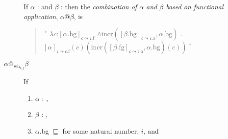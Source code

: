 \begin{description}
  If $\alpha$ :  
and $\beta$ : 
                         then the \textit{combination of $\alpha$ and
    $\beta$  based on functional application}, $\alpha\text{@}\beta$, is
  \begin{quote}
   $\ulcorner\lambda c$:$[\alpha.\text{bg}]_{\mathfrak{c}\leadsto\mathfrak{c}.\text{f}}$
      \d{$\wedge$}$\mathrm{incr}([\beta.\text{bg}]_{\mathfrak{c}\leadsto\mathfrak{c}.\text{a}},\alpha.\text{bg})$
      . \\
      \hspace*{2em}$[\alpha]_{\mathfrak{c}\leadsto\mathfrak{c}.\text{f}}(c)(\mathrm{incr}([\beta.\text{fg}]_{\mathfrak{c}\leadsto\mathfrak{c}.\text{a}},\alpha.\text{bg})(c))\urcorner$

      
    \end{quote}

      \item[\textnormal{$\alpha\text{@}_{\mathrm{wh}_{i,j}}\beta$}]
    \mbox{}

      If
  \begin{enumerate}
  \item $\alpha$ : ,
    
  \item $\beta$ : ,
    
  \item $\alpha$.bg $\sqsubseteq$  for some natural number,
    $i$, and
    

\end{enumerate}
\end{description}
